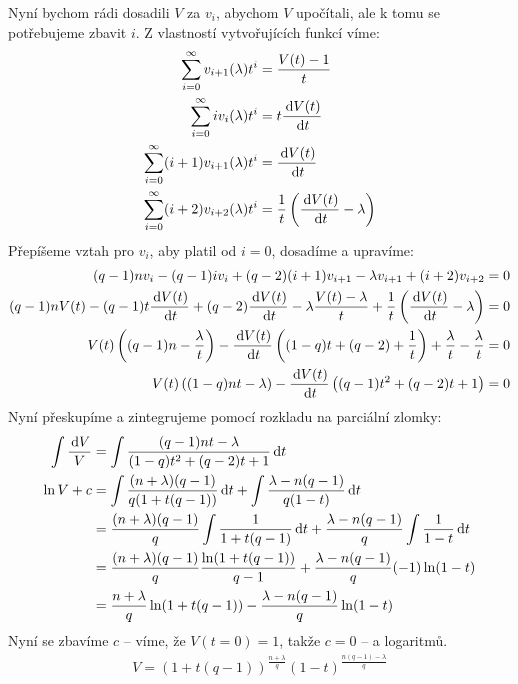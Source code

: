 Nyní bychom rádi dosadili $V$ za $v_i$, abychom $V$ upočítali, ale k tomu
se potřebujeme zbavit $i$. Z vlastností vytvořujících funkcí víme:
\begin{align}
  \sum_{i=0}^\infty v_{i+1}(\lambda) t^i &= \frac{V(t) - 1}{t} \\
  \sum_{i=0}^\infty i v_i(\lambda) t^i     &= t \frac{\,\textrm{d} V(t)}{\,\textrm{d} t} \\
  \sum_{i=0}^\infty (i+1) v_{i+1}(\lambda) t^i &= \frac{\,\textrm{d} V(t)}{\,\textrm{d} t} \\
  \sum_{i=0}^\infty (i+2) v_{i+2}(\lambda) t^i &=
    \frac{1}{t}\left( \frac{\,\textrm{d} V(t)}{\,\textrm{d} t} - \lambda \right)
\end{align}
Přepíšeme vztah pro $v_i$, aby platil od $i = 0$, dosadíme a upravíme:
\begin{align}
  (q - 1)n v_i - (q - 1) i v_i + (q-2)(i+1)v_{i+1}
    - \lambda v_{i+1} +(i+2)v_{i+2} &= 0 \\
  (q - 1)n V(t) - (q - 1)t \frac{\,\textrm{d} V(t)}{\,\textrm{d} t}
    + (q-2)\frac{\,\textrm{d} V(t)}{\,\textrm{d} t} - \lambda \frac{V(t) - \lambda}{t}
    + \frac{1}{t}\left(\frac{\,\textrm{d} V(t)}{\,\textrm{d} t} - \lambda \right) &= 0 \\
  V(t) \left( (q - 1)n - \frac{\lambda}{t} \right) -
    \frac{\,\textrm{d} V(t)}{\,\textrm{d} t} \left( (1 - q)t + (q-2) + \frac{1}{t} \right)
    + \frac{\lambda}{t} - \frac{\lambda}{t} &= 0 \\
  V(t)\left( (1 - q)nt - \lambda \right) - \frac{\,\textrm{d} V(t)}{\,\textrm{d} t} \left(
    (q - 1)t^2 + (q-2)t + 1
    \right) &= 0
\end{align}
Nyní přeskupíme a zintegrujeme pomocí rozkladu na parciální zlomky:
\begin{align}
  \int \frac{\,\textrm{d} V}{V} &=
    \int \frac{(q - 1)nt - \lambda}{(1 - q)t^2 + (q-2)t + 1} \,\textrm{d} t \\
  \ln V + c &= \int \frac{(n+\lambda)(q-1)}{q(1 + t(q-1))} \,\textrm{d} t +
               \int \frac{\lambda - n(q - 1)}{q(1 - t)} \,\textrm{d} t \\
   &= \frac{(n+\lambda)(q-1)}{q} \int \frac{1}{1 + t(q-1)} \,\textrm{d} t +
               \frac{\lambda - n(q - 1)}{q} \int \frac{1}{1 - t} \,\textrm{d} t \\
   &= \frac{(n+\lambda)(q-1)}{q} \frac{\ln (1 + t(q-1))}{q-1} +
               \frac{\lambda - n(q - 1)}{q} (-1) \ln (1 - t) \\
   &= \frac{n+\lambda}{q} \ln (1 + t(q-1)) -
               \frac{\lambda - n(q - 1)}{q} \ln (1 - t)
\end{align}
Nyní se zbavíme $c$ -- víme, že $V(t = 0) = 1$, takže $c = 0$ -- a logaritmů.
\begin{align}
  V = (1 + t(q-1))^{\frac{n + \lambda}{q}} (1 - t)^{\frac{n(q-1) - \lambda}{q}}
\end{align}
